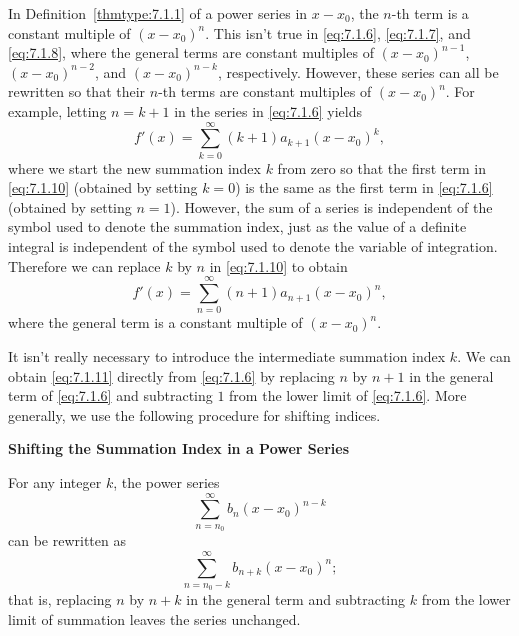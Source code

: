 \documentclass{ximera}
\begin{document}
In Definition~\ref{thmtype:7.1.1} of a power series in $x-x_0$, the $n$-th
term is a constant multiple of $(x-x_0)^n$. This isn't  true in
\eqref{eq:7.1.6}, \eqref{eq:7.1.7}, and \eqref{eq:7.1.8}, where the general
terms are constant multiples of $(x-x_0)^{n-1}$, $(x-x_0)^{n-2}$, and
$(x-x_0)^{n-k}$, respectively. However, these series can all be
rewritten so that their $n$-th terms are constant multiples of
$(x-x_0)^n$. For example, letting $n=k+1$ in the series in
\eqref{eq:7.1.6} yields
\begin{equation} \label{eq:7.1.10}
f'(x)=\sum_{k=0}^\infty (k+1)a_{k+1}(x-x_0)^k,
\end{equation}
where we start the new summation index $k$ from zero so that the first
term in \eqref{eq:7.1.10} (obtained by setting $k=0$) is the same as the
first term in \eqref{eq:7.1.6} (obtained by setting $n=1$). However, the
sum of a series is independent of the symbol used to denote the
summation index, just as the value of a definite integral is
independent of the symbol used to denote the variable of integration.
Therefore we can replace $k$ by $n$ in \eqref{eq:7.1.10} to obtain
\begin{equation} \label{eq:7.1.11}
f'(x)=\sum_{n=0}^\infty (n+1)a_{n+1}(x-x_0)^n,
\end{equation}
where the general term is a  constant multiple of  $(x-x_0)^n$.

It isn't  really necessary to introduce the intermediate summation
index $k$. We can obtain \eqref{eq:7.1.11} directly from \eqref{eq:7.1.6}
by replacing $n$ by $n+1$ in the general term of \eqref{eq:7.1.6} and
subtracting $1$ from the lower limit of \eqref{eq:7.1.6}. More generally,
we use the following procedure for shifting indices.

\begin{procedure}
{\bf Shifting the Summation Index in a Power
Series}

For any integer $k$,  the power series
$$
\sum_{n=n_0}^\infty b_n(x-x_0)^{n-k}
$$
can be rewritten  as
$$
\sum_{n=n_0-k}^\infty b_{n+k}(x-x_0)^n;
$$
that is, replacing $n$ by $n+k$ in the general term and subtracting
$k$ from the lower limit of summation leaves the series unchanged.
\end{procedure}
\end{document}
